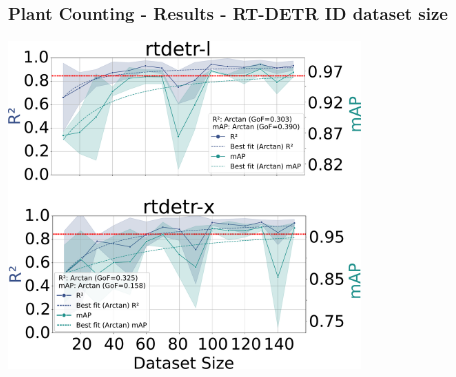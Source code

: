 \documentclass[aspectratio=43]{beamer}
\begin{document}
\begin{frame}
    \frametitle{\small Plant Counting - Results - RT-DETR ID dataset size}
    \begin{center}
        \includegraphics[width=0.7\textwidth]{Imgs/r2_ap_vs_dataset_size_rtdetr_3.pdf}
    \end{center}
\end{frame}

\end{document}
